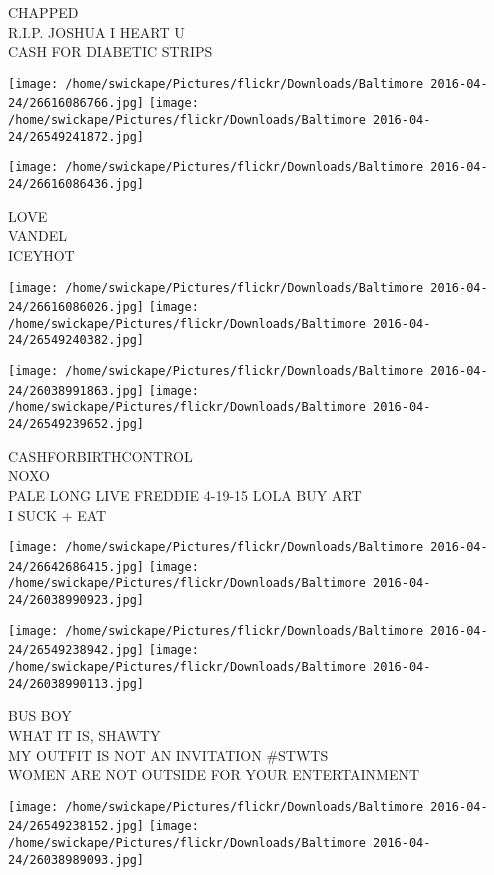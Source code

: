 \documentclass[10pt,letterpaper]{article}
\begin{document}
CHAPPED\\
R.I.P. JOSHUA I HEART U\\
CASH FOR DIABETIC STRIPS
\pagebreak

\texttt{[image: /home/swickape/Pictures/flickr/Downloads/Baltimore 2016-04-24/26616086766.jpg]}
\texttt{[image: /home/swickape/Pictures/flickr/Downloads/Baltimore 2016-04-24/26549241872.jpg]}

\vspace{0.25in}
\texttt{[image: /home/swickape/Pictures/flickr/Downloads/Baltimore 2016-04-24/26616086436.jpg]}

LOVE\\
VANDEL\\
ICEYHOT
\pagebreak

\texttt{[image: /home/swickape/Pictures/flickr/Downloads/Baltimore 2016-04-24/26616086026.jpg]}
\texttt{[image: /home/swickape/Pictures/flickr/Downloads/Baltimore 2016-04-24/26549240382.jpg]}

\texttt{[image: /home/swickape/Pictures/flickr/Downloads/Baltimore 2016-04-24/26038991863.jpg]}
\texttt{[image: /home/swickape/Pictures/flickr/Downloads/Baltimore 2016-04-24/26549239652.jpg]}

CASHFORBIRTHCONTROL\\
NOXO\\
PALE LONG LIVE FREDDIE 4{-}19{-}15 LOLA BUY ART\\
I SUCK + EAT
\pagebreak

\texttt{[image: /home/swickape/Pictures/flickr/Downloads/Baltimore 2016-04-24/26642686415.jpg]}
\texttt{[image: /home/swickape/Pictures/flickr/Downloads/Baltimore 2016-04-24/26038990923.jpg]}

\texttt{[image: /home/swickape/Pictures/flickr/Downloads/Baltimore 2016-04-24/26549238942.jpg]}
\texttt{[image: /home/swickape/Pictures/flickr/Downloads/Baltimore 2016-04-24/26038990113.jpg]}

BUS BOY\\
WHAT IT IS, SHAWTY\\
MY OUTFIT IS NOT AN INVITATION \#STWTS\\
WOMEN ARE NOT OUTSIDE FOR YOUR ENTERTAINMENT
\pagebreak

\texttt{[image: /home/swickape/Pictures/flickr/Downloads/Baltimore 2016-04-24/26549238152.jpg]}
\texttt{[image: /home/swickape/Pictures/flickr/Downloads/Baltimore 2016-04-24/26038989093.jpg]}
\end{document}
